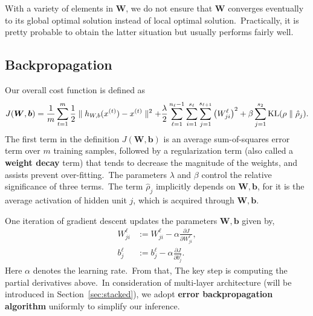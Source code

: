 With a variety of elements in $\bm{W}$, we do not ensure that $\bm{W}$ converges eventually to its global optimal solution instead of local optimal solution.~Practically, it is pretty probable to obtain the latter situation but usually performs fairly well.
\subsection{Backpropagation}
Our overall cost function is defined as
\begin{align}
J(\bm{W},\bm{b}) = \frac{1}{m} \sum_{t=1}^m \frac{1}{2} \parallel h_{W,b}(x^{(t)})- x^{(t)} \parallel ^2 + \frac{\lambda}{2} \sum_{\ell=1}^{n_\ell-1} \sum_{i=1}^{s_\ell} \sum_{j=1}^{s_{\ell+1}} \left( W^{\ell}_{ji} \right)^2 + \beta \sum_{j=1}^{s_2} {\rm KL}(\rho \parallel \hat\rho_j).
\end{align}
The first term in the definition $J(\bm{W},\bm{b})$ is an average sum-of-squares error term over $m$ training samples, followed by a regularization term (also called a \textbf{weight decay} term) that tends to decrease the magnitude of the weights, and assists prevent over-fitting.~The parameters $\lambda$ and $\beta$ control the relative significance of three terms.~The term $\hat{\rho}_j$ implicitly depends on $\bm{W},\bm{b}$, for it is the average activation of hidden unit $j$, which is acquired through $\bm{W},\bm{b}$.

One iteration of gradient descent updates the parameters $\bm{W},\bm{b}$ given by,
\begin{align}
	W_{ji}^{\ell} &:= W_{ji}^{\ell} - \alpha \frac{\partial J}{\partial W_{ji}^{\ell}}, \\
	b_j^\ell &:= b_j^\ell - \alpha \frac{\partial J}{\partial b_j^\ell}.
\end{align}
Here $\alpha$ denotes the learning rate.~From that, The key step is computing the partial derivatives above.~In consideration of multi-layer architecture (will be introduced in Section~\ref{sec:stacked}), we adopt \textbf{error backpropagation algorithm} uniformly to simplify our inference.

